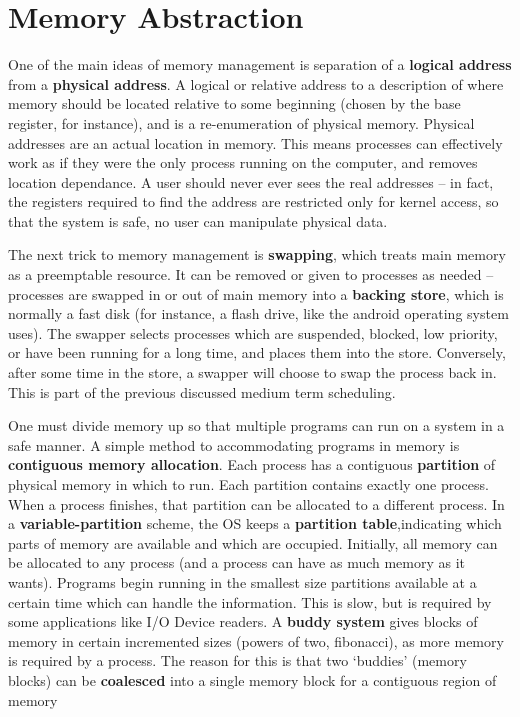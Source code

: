 \section{Memory Abstraction}

One of the main ideas of memory management is separation of a {\bf logical address} from a {\bf physical address}. A logical or relative address to a description of where memory should be located relative to some beginning (chosen by the base register, for instance), and is a re-enumeration of physical memory. Physical addresses are an actual location in memory. This means processes can effectively work as if they were the only process running on the computer, and removes location dependance. A user should never ever sees the real addresses -- in fact, the registers required to find the address are restricted only for kernel access, so that the system is safe, no user can manipulate physical data.

The next trick to memory management is {\bf swapping}, which treats main memory as a preemptable resource. It can be removed or given to processes as needed -- processes are swapped in or out of main memory into a {\bf backing store}, which is normally a fast disk (for instance, a flash drive, like the android operating system uses). The swapper selects processes which are suspended, blocked, low priority, or have been running for a long time, and places them into the store. Conversely, after some time in the store, a swapper will choose to swap the process back in. This is part of the previous discussed medium term scheduling.

One must divide memory up so that multiple programs can run on a system in a safe manner. A simple method to accommodating programs in memory is {\bf contiguous memory allocation}. Each process has a contiguous {\bf partition} of physical memory in which to run. Each partition contains exactly one process. When a process finishes, that partition can be allocated to a different process. In a {\bf variable-partition} scheme, the OS keeps a {\bf partition table},indicating which parts of memory are available and which are occupied. Initially, all memory can be allocated to any process (and a process can have as much memory as it wants). Programs begin running in the smallest size partitions available at a certain time which can handle the information. This is slow, but is required by some applications like I/O Device readers. A {\bf buddy system} gives blocks of memory in certain incremented sizes (powers of two, fibonacci), as more memory is required by a process. The reason for this is that two `buddies' (memory blocks) can be {\bf coalesced} into a single memory block for a contiguous region of memory

